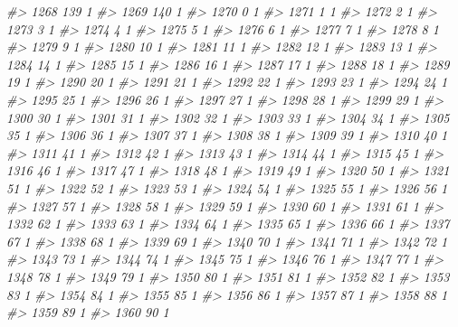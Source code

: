 \documentclass[]{article}
\newenvironment{Shaded}{\begin{snugshade}}{\end{snugshade}}
\newcommand{\CommentTok}[1]{\textcolor[rgb]{0.56,0.35,0.01}{\textit{#1}}}
\begin{document}
\begin{Shaded}
\begin{Highlighting}[]
\CommentTok{#> 1268 139  1}
\CommentTok{#> 1269 140  1}
\CommentTok{#> 1270   0  1}
\CommentTok{#> 1271   1  1}
\CommentTok{#> 1272   2  1}
\CommentTok{#> 1273   3  1}
\CommentTok{#> 1274   4  1}
\CommentTok{#> 1275   5  1}
\CommentTok{#> 1276   6  1}
\CommentTok{#> 1277   7  1}
\CommentTok{#> 1278   8  1}
\CommentTok{#> 1279   9  1}
\CommentTok{#> 1280  10  1}
\CommentTok{#> 1281  11  1}
\CommentTok{#> 1282  12  1}
\CommentTok{#> 1283  13  1}
\CommentTok{#> 1284  14  1}
\CommentTok{#> 1285  15  1}
\CommentTok{#> 1286  16  1}
\CommentTok{#> 1287  17  1}
\CommentTok{#> 1288  18  1}
\CommentTok{#> 1289  19  1}
\CommentTok{#> 1290  20  1}
\CommentTok{#> 1291  21  1}
\CommentTok{#> 1292  22  1}
\CommentTok{#> 1293  23  1}
\CommentTok{#> 1294  24  1}
\CommentTok{#> 1295  25  1}
\CommentTok{#> 1296  26  1}
\CommentTok{#> 1297  27  1}
\CommentTok{#> 1298  28  1}
\CommentTok{#> 1299  29  1}
\CommentTok{#> 1300  30  1}
\CommentTok{#> 1301  31  1}
\CommentTok{#> 1302  32  1}
\CommentTok{#> 1303  33  1}
\CommentTok{#> 1304  34  1}
\CommentTok{#> 1305  35  1}
\CommentTok{#> 1306  36  1}
\CommentTok{#> 1307  37  1}
\CommentTok{#> 1308  38  1}
\CommentTok{#> 1309  39  1}
\CommentTok{#> 1310  40  1}
\CommentTok{#> 1311  41  1}
\CommentTok{#> 1312  42  1}
\CommentTok{#> 1313  43  1}
\CommentTok{#> 1314  44  1}
\CommentTok{#> 1315  45  1}
\CommentTok{#> 1316  46  1}
\CommentTok{#> 1317  47  1}
\CommentTok{#> 1318  48  1}
\CommentTok{#> 1319  49  1}
\CommentTok{#> 1320  50  1}
\CommentTok{#> 1321  51  1}
\CommentTok{#> 1322  52  1}
\CommentTok{#> 1323  53  1}
\CommentTok{#> 1324  54  1}
\CommentTok{#> 1325  55  1}
\CommentTok{#> 1326  56  1}
\CommentTok{#> 1327  57  1}
\CommentTok{#> 1328  58  1}
\CommentTok{#> 1329  59  1}
\CommentTok{#> 1330  60  1}
\CommentTok{#> 1331  61  1}
\CommentTok{#> 1332  62  1}
\CommentTok{#> 1333  63  1}
\CommentTok{#> 1334  64  1}
\CommentTok{#> 1335  65  1}
\CommentTok{#> 1336  66  1}
\CommentTok{#> 1337  67  1}
\CommentTok{#> 1338  68  1}
\CommentTok{#> 1339  69  1}
\CommentTok{#> 1340  70  1}
\CommentTok{#> 1341  71  1}
\CommentTok{#> 1342  72  1}
\CommentTok{#> 1343  73  1}
\CommentTok{#> 1344  74  1}
\CommentTok{#> 1345  75  1}
\CommentTok{#> 1346  76  1}
\CommentTok{#> 1347  77  1}
\CommentTok{#> 1348  78  1}
\CommentTok{#> 1349  79  1}
\CommentTok{#> 1350  80  1}
\CommentTok{#> 1351  81  1}
\CommentTok{#> 1352  82  1}
\CommentTok{#> 1353  83  1}
\CommentTok{#> 1354  84  1}
\CommentTok{#> 1355  85  1}
\CommentTok{#> 1356  86  1}
\CommentTok{#> 1357  87  1}
\CommentTok{#> 1358  88  1}
\CommentTok{#> 1359  89  1}
\CommentTok{#> 1360  90  1}

\end{Highlighting}
\end{Shaded}
\end{document}
